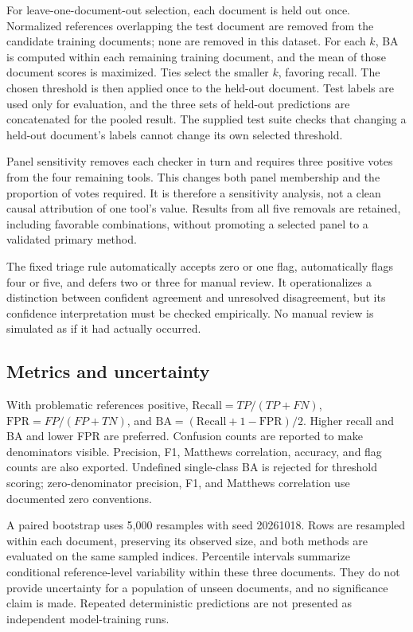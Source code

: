 \documentclass[acmsmall,screen,nonacm]{acmart}
\begin{document}
For leave-one-document-out selection, each document is held out once. Normalized references overlapping the test document are removed from the candidate training documents; none are removed in this dataset. For each $k$, BA is computed within each remaining training document, and the mean of those document scores is maximized. Ties select the smaller $k$, favoring recall. The chosen threshold is then applied once to the held-out document. Test labels are used only for evaluation, and the three sets of held-out predictions are concatenated for the pooled result. The supplied test suite checks that changing a held-out document's labels cannot change its own selected threshold.

Panel sensitivity removes each checker in turn and requires three positive votes from the four remaining tools. This changes both panel membership and the proportion of votes required. It is therefore a sensitivity analysis, not a clean causal attribution of one tool's value. Results from all five removals are retained, including favorable combinations, without promoting a selected panel to a validated primary method.

The fixed triage rule automatically accepts zero or one flag, automatically flags four or five, and defers two or three for manual review. It operationalizes a distinction between confident agreement and unresolved disagreement, but its confidence interpretation must be checked empirically. No manual review is simulated as if it had actually occurred.

\subsection{Metrics and uncertainty}
With problematic references positive, $\mathrm{Recall}=TP/(TP+FN)$, $\mathrm{FPR}=FP/(FP+TN)$, and $\mathrm{BA}=(\mathrm{Recall}+1-\mathrm{FPR})/2$. Higher recall and BA and lower FPR are preferred. Confusion counts are reported to make denominators visible. Precision, F1, Matthews correlation, accuracy, and flag counts are also exported. Undefined single-class BA is rejected for threshold scoring; zero-denominator precision, F1, and Matthews correlation use documented zero conventions.

A paired bootstrap uses 5,000 resamples with seed 20261018. Rows are resampled within each document, preserving its observed size, and both methods are evaluated on the same sampled indices. Percentile intervals summarize conditional reference-level variability within these three documents. They do not provide uncertainty for a population of unseen documents, and no significance claim is made. Repeated deterministic predictions are not presented as independent model-training runs.
\end{document}
